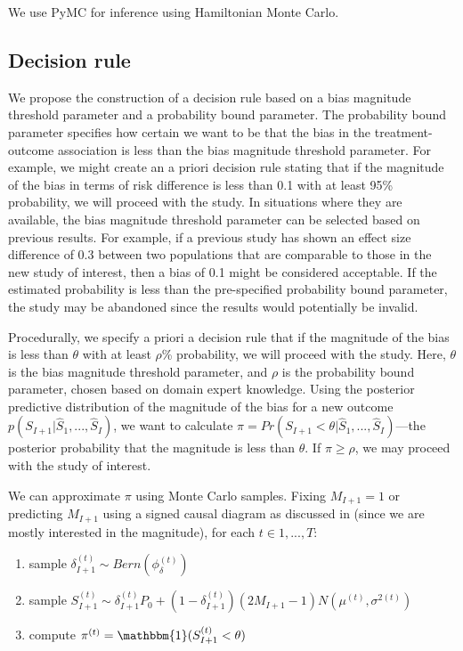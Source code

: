 We use PyMC for inference using Hamiltonian Monte Carlo.

\subsection{Decision rule}

We propose the construction of a decision rule based on a bias magnitude threshold parameter and a probability bound parameter. The probability bound parameter specifies how certain we want to be that the bias in the treatment-outcome association is less than the bias magnitude threshold parameter. For example, we might create an a priori decision rule stating that if the magnitude of the bias in terms of risk difference is less than 0.1 with at least 95\% probability, we will proceed with the study. In situations where they are available, the bias magnitude threshold parameter can be selected based on previous results. For example, if a previous study has shown an effect size difference of 0.3 between two populations that are comparable to those in the new study of interest, then a bias of 0.1 might be considered acceptable. If the estimated probability is less than the pre-specified probability bound parameter, the study may be abandoned since the results would potentially be invalid.

Procedurally, we specify a priori a decision rule that if the magnitude of the bias is less than $\theta$ with at least $\rho$\% probability, we will proceed with the study. Here, $\theta$ is the bias magnitude threshold parameter, and $\rho$ is the probability bound parameter, chosen based on domain expert knowledge.
Using the posterior predictive distribution of the magnitude of the bias for a new outcome $p(S_{I+1}|\widehat{S}_{1},...,\widehat{S}_{I})$, we want to calculate $\pi=Pr(S_{I+1} < \theta | \widehat{S}_{1},...,\widehat{S}_{I})$---the posterior probability that the magnitude is less than $\theta$. If $\pi \geq \rho$, we may proceed with the study of interest.

We can approximate $\pi$ using Monte Carlo samples. Fixing $M_{I+1}=1$ or predicting $M_{I+1}$ using a signed causal diagram as discussed in \cite{hernan2010causal} (since we are mostly interested in the magnitude), for each $t \in {1, ..., T}$:
\begin{enumerate}
    \item sample $\delta_{I+1}^{(t)} \sim Bern(\phi_\delta^{(t)})$
    \item sample $S_{I+1}^{(t)} \sim  \delta_{I+1}^{(t)} P_0 + (1-\delta_{I+1}^{(t)})(2M_{I+1} - 1)N(\mu^{(t)}, \sigma^{2(t)})$
    \item compute $\pi^{(t)} = \mathbbm{1}(S_{I+1}^{(t)} < \theta)$
\end{enumerate}

